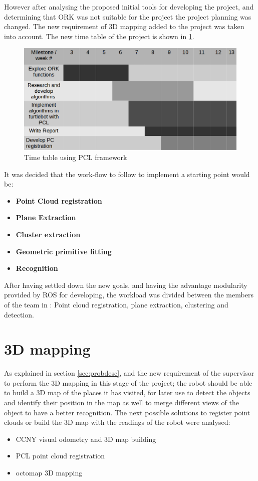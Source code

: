 \documentclass[fontsize=12pt]{article}
\begin{document}
However after analysing the proposed initial tools for developing the project, and determining that ORK was not suitable for the project the project planning was changed. The new requirement of 3D mapping added to the project was taken into account. The new time table of the project is shown in \ref{fig:plan2}.
\begin{figure}[H]
\begin{center}
\includegraphics[width=0.7\linewidth]{images/plan2}
\caption{Time table using PCL framework}
\label{fig:plan2}
\end{center}
\end{figure}

It was decided that the work-flow to follow to implement a starting point would be:
\begin{itemize}
\item \textbf{Point Cloud registration}
\item\textbf{Plane Extraction}
\item \textbf{Cluster extraction}
\item \textbf{Geometric primitive fitting}
\item \textbf{Recognition}
\end{itemize}
After having settled down the new goals, and having the advantage modularity provided by ROS for developing, the workload was divided between the members of the team in : Point cloud registration, plane extraction,  clustering and detection.    

\section{3D mapping}
\label{sec:map}
As explained in section \ref{sec:probdesc}, and the new requirement of the supervisor to perform the 3D mapping in this stage of the project; the robot should be able to build a 3D map of the places it has visited, for later use to detect the objects and identify their position in the map as well to merge different views of the object to have a better recognition. The next possible solutions to register point clouds or build the 3D map with the readings of the robot were analysed:
\begin{itemize}
\item CCNY visual odometry and 3D map building
\item PCL point cloud registration
\item octomap 3D mapping
\end{itemize}
\end{document}
